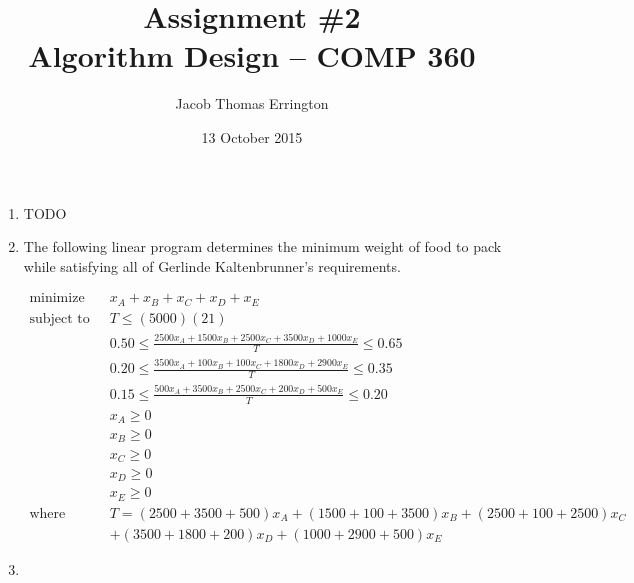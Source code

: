 \documentclass[letterpaper,11pt]{article}
\author{Jacob Thomas Errington}
\title{Assignment \#2 \\ Algorithm Design -- COMP 360}
\date{13 October 2015}
\begin{document}
\maketitle

\begin{enumerate}

    \item TODO


    \item The following linear program determines the minimum weight of food
        to pack while satisfying all of Gerlinde Kaltenbrunner's requirements.

        \begin{align*}
            \text{minimize} \quad
                & x_A + x_B + x_C + x_D + x_E                                                         \\
            \text{subject to} \quad
                & T    \leq (5000)(21)                                                                \\
                & 0.50 \leq \frac{2500x_A + 1500x_B + 2500x_C + 3500x_D + 1000x_E}{T} \leq 0.65       \\
                & 0.20 \leq \frac{3500x_A + 100x_B  + 100x_C  + 1800x_D + 2900x_E}{T} \leq 0.35       \\
                & 0.15 \leq \frac{500x_A  + 3500x_B + 2500x_C + 200x_D  + 500x_E }{T} \leq 0.20       \\
                & x_A  \geq 0                                                                         \\
                & x_B  \geq 0                                                                         \\
                & x_C  \geq 0                                                                         \\
                & x_D  \geq 0                                                                         \\
                & x_E  \geq 0                                                                         \\
            \text{where} \quad
                & T    = (2500 + 3500 + 500) x_A + (1500 + 100 + 3500) x_B + (2500 + 100 + 2500) x_C  \\
                &      + (3500 + 1800 + 200) x_D + (1000 + 2900 + 500) x_E
        \end{align*}

    \item


\end{enumerate}
\end{document}
